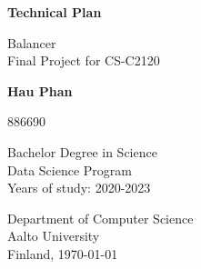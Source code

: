 \documentclass[12pt]{article}
\begin{document}
\begin{titlepage}
    \thispagestyle{fancy}
    \begin{center}
        \vspace*{1cm}
            
        \huge
        \textbf{Technical Plan}
            
        \vspace{0.5cm}
        \Large
        Balancer\\

        \normalsize
        \vspace{0.5cm}
        Final Project for CS-C2120
            
        \vspace{1.5cm}
            
        \textbf{Hau Phan}

        \normalsize
        886690
            
        \vfill

            
        Bachelor Degree in Science\\
        Data Science Program\\
        Years of study: 2020-2023
            
        \vspace{0.8cm}
            
        \normalsize
        Department of Computer Science\\
        Aalto University\\
        Finland, \today
    \end{center}
\end{titlepage}
\newpage

\tableofcontents
{}
\newpage
\end{document}
